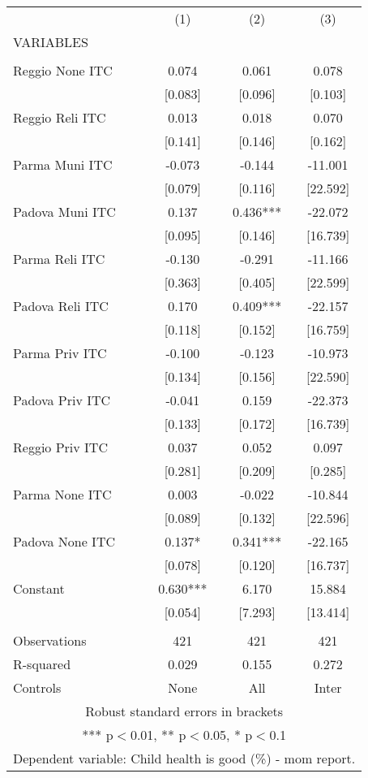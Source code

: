 \begin{tabular}{lccc} \hline
 & (1) & (2) & (3) \\
VARIABLES &  &  &  \\ \hline
 &  &  &  \\
Reggio None ITC & 0.074 & 0.061 & 0.078 \\
 & [0.083] & [0.096] & [0.103] \\
Reggio Reli ITC & 0.013 & 0.018 & 0.070 \\
 & [0.141] & [0.146] & [0.162] \\
Parma Muni ITC & -0.073 & -0.144 & -11.001 \\
 & [0.079] & [0.116] & [22.592] \\
Padova Muni ITC & 0.137 & 0.436*** & -22.072 \\
 & [0.095] & [0.146] & [16.739] \\
Parma Reli ITC & -0.130 & -0.291 & -11.166 \\
 & [0.363] & [0.405] & [22.599] \\
Padova Reli ITC & 0.170 & 0.409*** & -22.157 \\
 & [0.118] & [0.152] & [16.759] \\
Parma Priv ITC & -0.100 & -0.123 & -10.973 \\
 & [0.134] & [0.156] & [22.590] \\
Padova Priv ITC & -0.041 & 0.159 & -22.373 \\
 & [0.133] & [0.172] & [16.739] \\
Reggio Priv ITC & 0.037 & 0.052 & 0.097 \\
 & [0.281] & [0.209] & [0.285] \\
Parma None ITC & 0.003 & -0.022 & -10.844 \\
 & [0.089] & [0.132] & [22.596] \\
Padova None ITC & 0.137* & 0.341*** & -22.165 \\
 & [0.078] & [0.120] & [16.737] \\
Constant & 0.630*** & 6.170 & 15.884 \\
 & [0.054] & [7.293] & [13.414] \\
 &  &  &  \\
Observations & 421 & 421 & 421 \\
R-squared & 0.029 & 0.155 & 0.272 \\
 Controls & None & All & Inter \\ \hline
\multicolumn{4}{c}{ Robust standard errors in brackets} \\
\multicolumn{4}{c}{ *** p$<$0.01, ** p$<$0.05, * p$<$0.1} \\
\multicolumn{4}{c}{ Dependent variable: Child health is good (\%) - mom report.} \\
\end{tabular}
